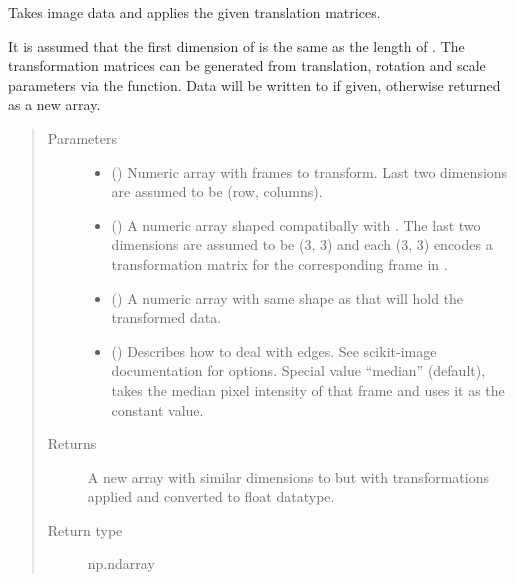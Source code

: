 \documentclass[letterpaper,10pt,english]{sphinxmanual}
\begin{document}

\begin{fulllineitems}
\label{\detokenize{xanespy:xanespy.xanes_math.transform_images}}
Takes image data and applies the given translation matrices.

It is assumed that the first dimension of  is the same as
the length of . The transformation matrices can
be generated from translation, rotation and scale parameters via
the 
function. Data will be written to  if given, otherwise
returned as a new array.
\begin{quote}\begin{description}
\item[{Parameters}] \leavevmode\begin{itemize}
\item {} 
 () \textendash{} Numeric array with frames to transform. Last two dimensions are
assumed to be (row, columns).

\item {} 
 () \textendash{} A numeric array shaped compatibally with . The last two
dimensions are assumed to be (3, 3) and each (3, 3) encodes a
transformation matrix for the corresponding frame in .

\item {} 
 (\sphinxstyleliteralemphasis{, }) \textendash{} A numeric array with same shape as  that will hold the
transformed data.

\item {} 
 (\sphinxstyleliteralemphasis{, }) \textendash{} Describes how to deal with edges. See scikit-image documentation
for options. Special value “median” (default), takes the median
pixel intensity of that frame and uses it as the constant value.

\end{itemize}

\item[{Returns}] \leavevmode
{} \textendash{} A new array with similar dimensions to  but with
transformations applied and converted to float datatype.

\item[{Return type}] \leavevmode
np.ndarray

\end{description}\end{quote}

\end{fulllineitems}
\end{document}
